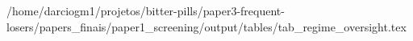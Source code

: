 /home/darciogm1/projetos/bitter-pills/paper3-frequent-losers/papers_finais/paper1_screening/output/tables/tab_regime_oversight.tex